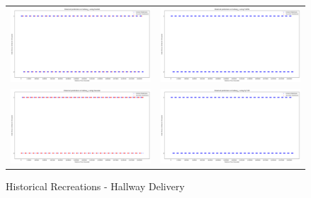 \begin{figure}
  \begin{tabular}{cc}
    {\includegraphics[width = 3in]{images/results/Historical_hallway_L_Duckett.png}} &
    {\includegraphics[width = 3in]{images/results/Historical_hallway_L_FreMEn.png}} \\
    {\includegraphics[width = 3in]{images/results/Historical_hallway_L_Gaussian.png}} &
    {\includegraphics[width = 3in]{images/results/Historical_hallway_L_HyT-EM.png}} \\
  \end{tabular}
  \caption{Historical Recreations - Hallway Delivery}
\end{figure}

